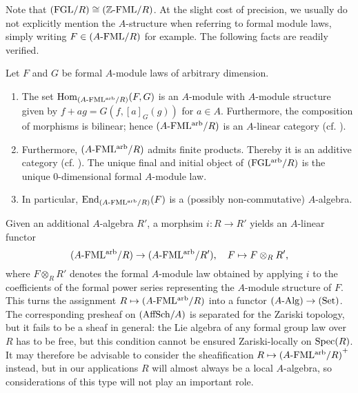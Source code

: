 \documentclass[../main.tex]{subfiles}
\begin{document}
Note that ${(\mathrm{FGL}/{R})} \cong {({\mathbb{Z}}\textnormal-\allowbreak\mathrm{FML}/{R})}$.
At the slight cost of precision, we usually do not explicitly mention the
$A$-structure when referring to formal module laws, simply writing $F \in
{({A}\textnormal-\allowbreak\mathrm{FML}/{R})}$ for example. 
The following facts are readily verified.
\begin{lem}
  Let $F$ and $G$ be formal $A$-module laws of arbitrary dimension.
  \begin{enumerate}
    \item The set $\operatorname{Hom}_{{({A}\textnormal-\allowbreak\mathrm{FML^{arb}}/{R})}} (F,G)$
      is an $A$-module with $A$-module structure
      given by $f+ag = G(f,[a]_G(g))$ for $a \in A$. 
      Furthermore, the composition of morphisms is bilinear; hence
      ${({A}\textnormal-\allowbreak\mathrm{FML^{arb}}/{R})}$ is an $A$-linear category (cf.
      \cite[\href{https://stacks.math.columbia.edu/tag/09MI}{Tag
      09MI}]{stacks-project}). 
    \item Furthermore, ${({A}\textnormal-\allowbreak\mathrm{FML^{arb}}/{R})}$ admits finite products. Thereby it is 
      an additive category (cf.
      \cite[\href{https://stacks.math.columbia.edu/tag/0104}{Tag
      0104}]{stacks-project}).
      The unique final and initial object of ${(\mathrm{FGL^{arb}}/{R})}$ is the unique
      $0$-dimensional formal $A$-module law.
    \item In particular, $\operatorname{End}_{{({A}\textnormal-\allowbreak\mathrm{FML^{arb}}/{R})}}(F)$ is a (possibly non-commutative)
      $A$-algebra.
  \end{enumerate}
\end{lem}

Given an additional $A$-algebra $R'$, a morphsim
$i\colon R \to R'$ yields an $A$-linear functor 
\begin{equation*}
    {({A}\textnormal-\allowbreak\mathrm{FML^{arb}}/{R})} \to {({A}\textnormal-\allowbreak\mathrm{FML^{arb}}/{R'})}, \quad
    F \mapsto F \otimes_R R',
\end{equation*}
where $F \otimes_R R'$ denotes the formal $A$-module law obtained by applying $i$
to the coefficients of the formal power series representing the $A$-module structure of $F$. 
This turns the assignment $R \mapsto {({A}\textnormal-\allowbreak\mathrm{FML^{arb}}/{R})}$ into a 
functor ${({A}\textnormal-\allowbreak\mathrm{Alg})} \to {(\mathrm{Set})}$. The corresponding presheaf on ${(\mathrm{AffSch}/{A})}$ is
separated for the Zariski topology, 
but it fails to be a sheaf in general: the Lie algebra of any
formal group law over $R$ has to be free, but this condition cannot be 
ensured Zariski-locally on $\operatorname{Spec}(R)$. It may therefore be 
advisable to consider the sheafification $R \mapsto {({A}\textnormal-\allowbreak\mathrm{FML^{arb}}/{R})}^+$ instead,
but in our applications
$R$ will almost always be a local $A$-algebra, so considerations
of this type will not play an important role.
\end{document}
